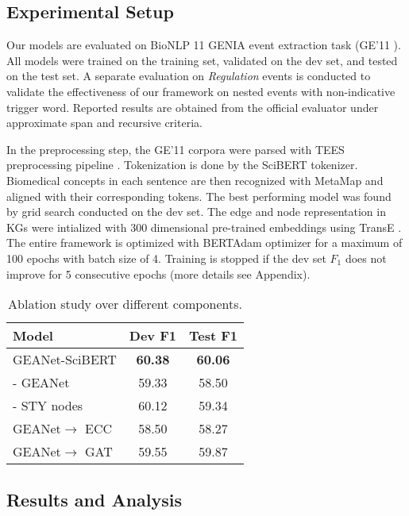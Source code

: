 \documentclass[11pt,a4paper]{article}
\newcommand{\GAENet}{\textrm{GEANet}}
\newcommand{\GE}{\textrm{{\fontfamily{qcr}\selectfont GE'11} }}
\begin{document}
\subsection{Experimental Setup} \label{sec:setup}
Our models are evaluated on BioNLP 11 GENIA event extraction task (\GE). All models were trained on the training set, validated on the dev set, and tested on the test set. A separate evaluation on \textit{Regulation} events is conducted to validate the effectiveness of our framework on nested events with non-indicative trigger word. Reported results are obtained from the official evaluator under approximate span and recursive criteria.


In the preprocessing step, the \GE{} corpora were parsed with TEES preprocessing pipeline \cite{bjorne-salakoski-2018-biomedical}. Tokenization is done by the SciBERT tokenizer. Biomedical concepts in each sentence are then recognized with MetaMap and aligned with their corresponding tokens. The best performing model was found by grid search conducted on the dev set. The edge and node representation in KGs were intialized with 300 dimensional pre-trained embeddings using TransE \cite{wang2014knowledge}. The entire framework is optimized with BERTAdam optimizer for a maximum of 100 epochs with batch size of 4. Training is stopped if the dev set $F_{1}$ does not improve for 5 consecutive epochs (more details see Appendix). 

\begin{table}[t]
\small
\centering
\begin{tabular}[ht!]{lcc} 
\hline \textbf{Model} & \textbf{Dev F1} & \textbf{Test F1} \\ \hline
\GAENet-SciBERT & \textbf{60.38} & \textbf{60.06} \\
\quad - \GAENet & 59.33 & 58.50 \\
\quad - STY nodes & 60.12 & 59.34 \\
\quad \GAENet $\rightarrow$ ECC & 58.50 & 58.27 \\
\quad \GAENet $\rightarrow$ GAT & 59.55 & 59.87 \\

\hline
\end{tabular}
\caption{Ablation study over different components. \label{ablation}}
\vspace{-1em}
\end{table}
\subsection{Results and Analysis}
\end{document}
